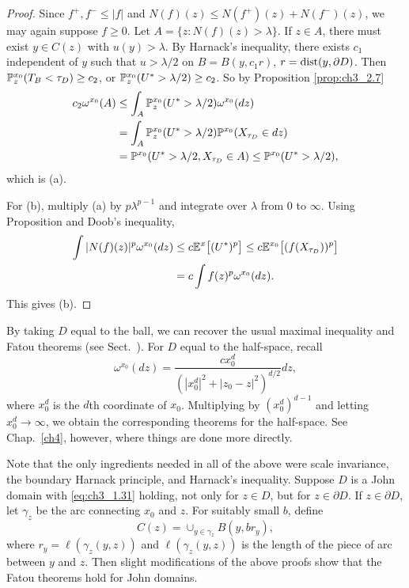 \begin{proof}
Since $f^+,f^- \leq |f|$ and $N(f)(z) \leq N(f^+)(z) + N(f^-)(z)$, we may again suppose $f \geq 0$. Let $A = \{z : N(f)(z) > \lambda\}$. If $z \in A$, there must exist $y \in C(z)$ with $u(y) > \lambda$. By Harnack's inequality, there exists $c_1$ independent of $y$ such that $u > \lambda/2$ on $B = B(y,c_1r)$, $r = \dist(y,\partial D)$. Then $\P_z^{x_0}(T_B < \tau_D) \geq c_2$, or $\P_z^{x_0}(U^* > \lambda/2) \geq c_2$. So by Proposition \ref{prop:ch3_2.7}
\begin{align}\label{eq:ch3_4.8}
    c_2\omega^{x_0}(A) &\leq \int_A \P_z^{x_0}(U^* > \lambda/2)\omega^{x_0}(dz) \\
    &= \int_A \P_z^{x_0}(U^* > \lambda/2)\P^{x_0}(X_{\tau_D} \in dz) \notag \\
    &= \P^{x_0}(U^* > \lambda/2, X_{\tau_D} \in A) \leq \P^{x_0}(U^* > \lambda/2), \notag
\end{align}
which is (a).

For (b), multiply (a) by $p\lambda^{p-1}$ and integrate over $\lambda$ from $0$ to $\infty$. Using Proposition  and Doob's inequality,
\begin{align*}
    \int |N(f)(z)|^p\omega^{x_0}(dz) &\leq c\E^x\big[(U^*)^p\big] \leq c\E^{x_0}\big[(f(X_{\tau_D}))^p\big] \\
    &= c \int f(z)^p\omega^{x_0}(dz).
\end{align*}
This gives (b).
\end{proof}

By taking $D$ equal to the ball, we can recover the usual maximal inequality and Fatou theorems (see Sect.\ ). For $D$ equal to the half-space, recall
\[
    \omega^{x_0}(dz) = \frac{cx_0^d}{(|x_0^d|^2 + |z_0 - z|^2)^{d/2}}dz,
\]
where $x_0^d$ is the $d$th coordinate of $x_0$. Multiplying by $(x_0^d)^{d-1}$ and letting $x_0^d \to \infty$, we obtain the corresponding theorems for the half-space. See Chap.\ \ref{ch4}, however, where things are done more directly.



Note that the only ingredients needed in all of the above were scale invariance, the boundary Harnack principle, and Harnack's inequality. Suppose $D$ is a John domain with \eqref{eq:ch3_1.31} holding, not only for $z \in D$, but for $z \in \partial D$. If $z \in \partial D$, let $\gamma_z$ be the arc connecting $x_0$ and $z$. For suitably small $b$, define
\[
    C(z) = \cup_{y \in \gamma_z} B(y,br_y),
\]
where $r_y = \ell(\gamma_z(y,z))$ and $\ell(\gamma_z(y,z))$ is the length of the piece of arc between $y$ and $z$. Then slight modifications of the above proofs show that the Fatou theorems hold for John domains.

